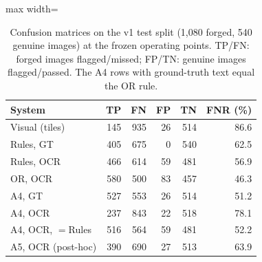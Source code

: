 \documentclass[12pt]{article}
\begin{document}
\clearpage
\begin{table}[H]
\caption{Confusion matrices on the v1 test split (1{,}080 forged, 540 genuine images) at the frozen operating points. TP/FN: forged images flagged/missed; FP/TN: genuine images flagged/passed. The A4 rows with ground-truth text equal the OR rule.}
\label{tab:confusion}
\centering
\scriptsize
\setlength{\tabcolsep}{4pt}
\renewcommand{\arraystretch}{1.06}
\begin{adjustbox}{max width=\linewidth}
\begin{tabular}{@{}l r r r r r@{}}
\toprule
System & TP & FN & FP & TN & FNR (\%) \\
\midrule
Visual (tiles) & 145 & 935 & 26 & 514 & 86.6 \\
Rules, GT & 405 & 675 & 0 & 540 & 62.5 \\
Rules, OCR & 466 & 614 & 59 & 481 & 56.9 \\
OR, OCR & 580 & 500 & 83 & 457 & 46.3 \\
A4, GT & 527 & 553 & 26 & 514 & 51.2 \\
A4, OCR & 237 & 843 & 22 & 518 & 78.1 \\
A4, OCR, $=$Rules & 516 & 564 & 59 & 481 & 52.2 \\
A5, OCR (post-hoc) & 390 & 690 & 27 & 513 & 63.9 \\
\bottomrule
\end{tabular}
\end{adjustbox}
\end{table}
\clearpage
\end{document}
